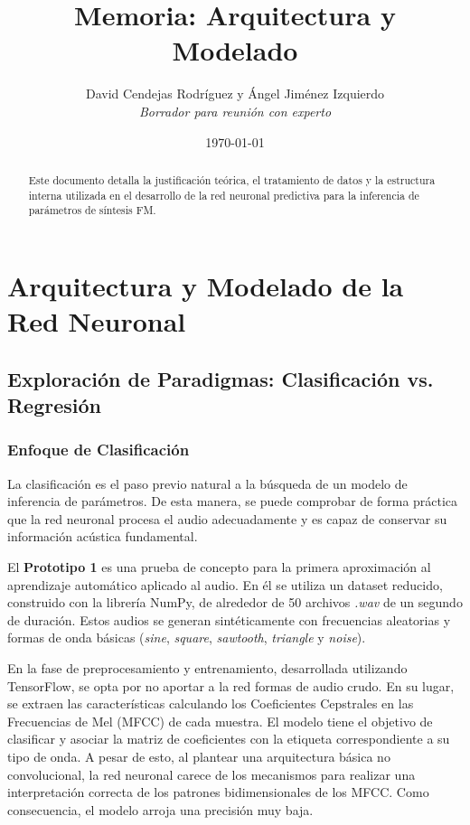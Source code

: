 \documentclass[12pt, a4paper]{article}
\title{\textbf{Memoria: Arquitectura y Modelado}}
\author{David Cendejas Rodríguez y Ángel Jiménez Izquierdo \\ \textit{Borrador para reunión con experto}}
\date{\today}
\begin{document}
\maketitle

\begin{abstract}
Este documento detalla la justificación teórica, el tratamiento de datos y la estructura interna utilizada en el desarrollo de la red neuronal predictiva para la inferencia de parámetros de síntesis FM.
\end{abstract}

\tableofcontents
\newpage

\section{Arquitectura y Modelado de la Red Neuronal}

\subsection{Exploración de Paradigmas: Clasificación vs. Regresión}
\subsubsection{Enfoque de Clasificación}
La clasificación es el paso previo natural a la búsqueda de un modelo de inferencia de parámetros.
De esta manera, se puede comprobar de forma práctica que la red neuronal procesa el audio adecuadamente
y es capaz de conservar su información acústica fundamental.

El \textbf{Prototipo 1} es una prueba de concepto para la primera aproximación al aprendizaje automático aplicado al audio.
En él se utiliza un dataset reducido, construido con la librería NumPy, de alrededor de 50 archivos \textit{.wav} de un segundo de duración.
Estos audios se generan sintéticamente
con frecuencias aleatorias y formas de onda básicas (\textit{sine}, \textit{square}, \textit{sawtooth}, \textit{triangle} y \textit{noise}).

En la fase de preprocesamiento y entrenamiento, desarrollada utilizando TensorFlow, se opta por
no aportar a la red formas de audio crudo. En su lugar, se extraen las características calculando
los Coeficientes Cepstrales en las Frecuencias de Mel (MFCC) de cada muestra. El modelo tiene el objetivo de clasificar 
y asociar la matriz de coeficientes con la etiqueta correspondiente a su tipo de onda. A pesar de esto, 
al plantear una arquitectura básica no convolucional, la red neuronal carece de los mecanismos para
realizar una interpretación correcta de los patrones bidimensionales de los MFCC. Como consecuencia, el 
modelo arroja una precisión muy baja. 
\end{document}
